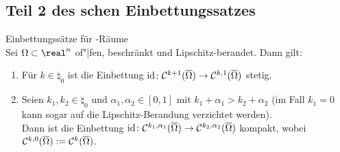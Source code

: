 \subsection{%
    Teil 2 des schen Einbettungssatzes%
}

\begin{Lemma}{Einbettungssätze für -Räume}\\
    Sei $\Omega \subset \real^n$ of"|fen, beschränkt und Lipschitz-berandet.
    Dann gilt:
    \begin{enumerate}
        \item
        Für $k \in \natural_0$ ist die Einbettung
        $\text{id}\colon \mathcal{C}^{k+1}(\overline{\Omega}) \to \mathcal{C}^{k,1}(\overline{\Omega})$ stetig.

        \item
        Seien $k_1, k_2 \in \natural_0$ und $\alpha_1, \alpha_2 \in [0, 1]$ mit
        $k_1 + \alpha_1 > k_2 + \alpha_2$
        (im Fall $k_1 = 0$ kann sogar auf die Lipschitz-Berandung verzichtet werden).\\
        Dann ist die Einbettung $\text{id}\colon \mathcal{C}^{k_1,\alpha_1}(\overline{\Omega}) \to
        \mathcal{C}^{k_2,\alpha_2}(\overline{\Omega})$ kompakt,
        wobei $\mathcal{C}^{k,0}(\overline{\Omega}) := \mathcal{C}^k(\overline{\Omega})$.
    \end{enumerate}
\end{Lemma}

